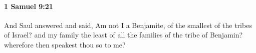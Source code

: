 
		\paragraph{1 Samuel 9:21} %
			\label{1SAMUEL-9-21}

			And Saul answered and said, Am not I a Benjamite, of the smallest of the tribes of Israel? and my family the least of all the families of the tribe of Benjamin? wherefore then speakest thou so to me?



